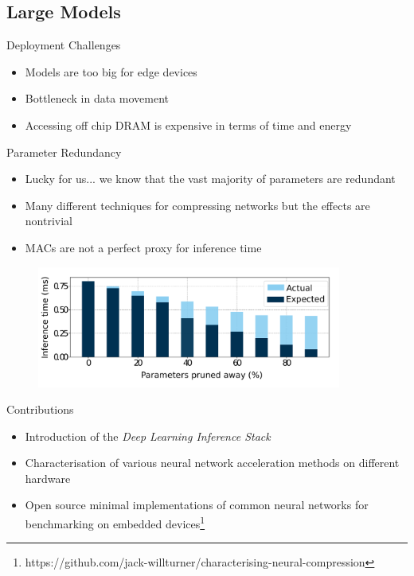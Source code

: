 \documentclass[xcolor=dvipsnames]{beamer}
\begin{document}
\subsection{Large Models}

\begin{frame}{Deployment Challenges}

\begin{itemize}
	\item Models are too big for edge devices 
    \item Bottleneck in data movement
    \item Accessing off chip DRAM is expensive in terms of time and energy
\end{itemize}

\end{frame}

\begin{frame}{Parameter Redundancy}



\begin{itemize}
	\item Lucky for us... we know that the vast majority of parameters are redundant 
    \item Many different techniques for compressing networks but the effects are nontrivial
    \item MACs are not a perfect proxy for inference time
\end{itemize}

\begin{figure}
    \centering
    \includegraphics[width=10cm]{images/speedup.pdf}
\end{figure}



\end{frame}


\begin{frame}{Contributions}
    
    \begin{itemize}
        \item Introduction of the \textit{Deep Learning Inference Stack}
        \item Characterisation of various neural network acceleration methods on different hardware
        \item Open source minimal implementations of common neural networks for benchmarking on embedded devices\footnote{https://github.com/jack-willturner/characterising-neural-compression}
    \end{itemize}
    
\end{frame}
\end{document}
